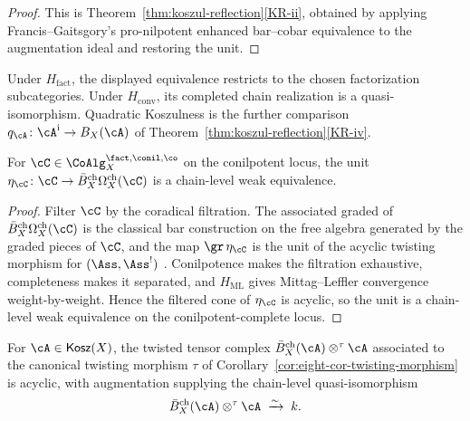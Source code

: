 \begin{proof}
This is Theorem~\ref{thm:koszul-reflection}\ref{KR-ii}, obtained by
applying Francis--Gaitsgory's pro-nilpotent enhanced bar--cobar
equivalence to the augmentation ideal and restoring the unit.
\end{proof}

\begin{remark}
\label{rem:eight-cor-counit-factorization-realization}
Under \(H_{\mathrm{fact}}\), the displayed equivalence restricts to the
chosen factorization subcategories.  Under \(H_{\mathrm{conv}}\), its
completed chain realization is a quasi-isomorphism.  Quadratic
Koszulness is the further comparison
\(q_\cA\colon\cA^{\mathrm i}\to B_X(\cA)\) of
Theorem~\ref{thm:koszul-reflection}\ref{KR-iv}.
\end{remark}

\begin{corollary}
\label{cor:eight-cor-unit-weq}
For $\cC\in\CoAlg^{\fact,\conil,\co}_X$ on the conilpotent locus, the
unit $\eta_\cC\colon\cC\to\Bbarch_X\Omegach_X(\cC)$ is a chain-level
weak equivalence.
\end{corollary}

\begin{proof}
Filter $\cC$ by the coradical filtration. The associated graded of
$\Bbarch_X\Omegach_X(\cC)$ is the classical bar construction on the
free algebra generated by the graded pieces of $\cC$, and the map
$\gr\,\eta_\cC$ is the unit of the acyclic twisting morphism for
$(\Ass,\Ass^!)$ \cite[Theorem~2.4.1]{LV12}. Conilpotence makes the
filtration exhaustive, completeness makes it separated, and
$H_{\mathrm{ML}}$ gives Mittag--Leffler convergence weight-by-weight. Hence the
filtered cone of $\eta_\cC$ is acyclic, so the unit is a chain-level
weak equivalence on the conilpotent-complete locus.
\end{proof}

\begin{corollary}
\label{cor:eight-cor-twisted-tensor}
For $\cA\in\Kosz(X)$, the twisted tensor complex
$\Bbarch_X(\cA)\otimes^{\tau}\cA$ associated to the canonical
twisting morphism $\tau$ of
Corollary~\ref{cor:eight-cor-twisting-morphism} is acyclic, with
augmentation supplying the chain-level quasi-isomorphism
\[
\Bbarch_X(\cA)\otimes^{\tau}\cA\;\xrightarrow{\sim}\;k.
\]
\end{corollary}

